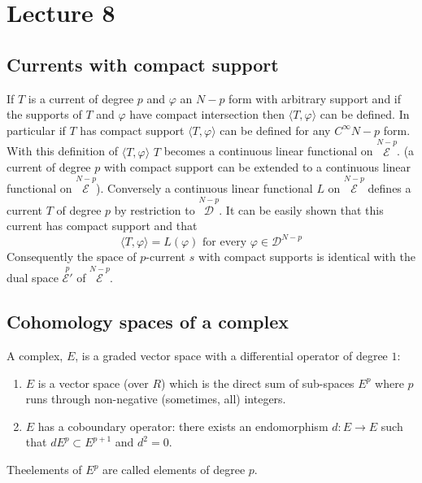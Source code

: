 \chapter{Lecture 8}

\section*{Currents with compact support}\pageoriginale

If $T$ is a current of degree $p$ and $\varphi$ an $N-p$ form with
arbitrary support and if the supports of $T$ and $\varphi$ have
compact intersection then $\langle T,\varphi\rangle$ can be
defined. In particular if $T$ has compact support $\langle
T,\varphi\rangle$ can be defined for any $C^{\infty}N-p$ form. With
this definition of $\langle T,\varphi\rangle$ $T$ becomes a continuous
linear functional on $\overset{N-p}{\mathscr{E}}$. (\iec a current of
degree $p$ with compact support can be extended to a continuous linear
functional on $\overset{N-p}{\mathscr{E}}$). Conversely a continuous
linear functional $L$ on $\overset{N-p}{\mathscr{E}}$ defines a
current $T$ of degree $p$ by restriction to
$\overset{N-p}{\mathscr{D}}$. It can be easily shown that this current
has compact support and that
$$
\langle T,\varphi\rangle =L(\varphi)\text{ \  for every \ } \varphi\in
\mathscr{D}^{N-p} 
$$
Consequently the space of $p$-current $s$ with compact supports is
identical with the dual space $\overset{p}{\mathscr{E}'}$ of
$\overset{N-p}{\mathscr{E}}$. 

\section*{Cohomology spaces of a complex}

A complex, $E$, is a graded vector space with a differential operator
of degree $1$:
\begin{enumerate}
\renewcommand{\theenumi}{\roman{enumi}}
\renewcommand{\labelenumi}{\theenumi)}
\item $E$ is a vector space (over $R$) which is the direct sum of
  sub-spaces $E^{p}$ where $p$ runs through non-negative (sometimes,
  all) integers.

\item $E$ has a coboundary operator: there exists an endomorphism
  $d:E\to E$ such that $dE^{p}\subset E^{p+1}$ and $d^{2}=0$. 
\end{enumerate}

The\pageoriginale elements of $E^{p}$ are called elements of degree
$p$.

